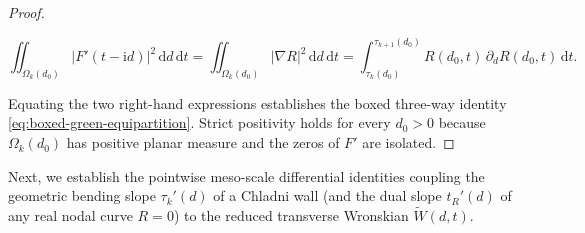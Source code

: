 \documentclass[11pt,reqno]{amsart}
\theoremstyle{definition}
\theoremstyle{remark}
\numberwithin{equation}{section}
\newcommand{\dd}{\mathrm{d}}
\newcommand{\ii}{\mathrm{i}}
\begin{document}
\begin{proof}
\begin{enumerate}[label=(\roman*),leftmargin=2.0em]
\[
\iint_{\Omega_k(d_0)} \bigl|F'(t-\ii d)\bigr|^2\,\dd d\,\dd t = \iint_{\Omega_k(d_0)} |\nabla R|^2\,\dd d\,\dd t = \int_{\tau_k(d_0)}^{\tau_{k+1}(d_0)} R(d_0,t)\,\partial_d R(d_0,t)\,\dd t.
\]
\end{enumerate}
Equating the two right-hand expressions establishes the boxed three-way identity \eqref{eq:boxed-green-equipartition}. Strict positivity holds for every $d_0 > 0$ because $\Omega_k(d_0)$ has positive planar measure and the zeros of $F'$ are isolated.
\end{proof}

Next, we establish the pointwise meso-scale differential identities coupling the geometric bending slope $\tau_k'(d)$ of a Chladni wall (and the dual slope $t_R'(d)$ of any real nodal curve $R=0$) to the reduced transverse Wronskian $\widetilde{W}(d,t)$.
\end{document}
